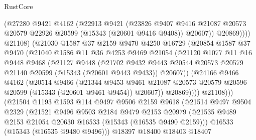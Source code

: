 \begin{lexlean}{RustCore}
\begin{coremodule}
                    (@27280
                      @9421
                      @4162
                      (@22913
                        @9421
                        (@23826
                          @9407
                          @9416
                          @21087
                          @20573
                          @20579
                          @22926
                          @20599
                          (@15343 (@20601 @9416 @9408))
                          @20607))
                      @20869))))
              @21108)
            (@21030
              @1587
              @37
              @2159
              @9470
              @4250
              @16729
              (@20854
                @1587
                @37
                @9470
                (@21040
                  @1586
                  @11
                  @36
                  @4253
                  @9469
                  @21054
                  (@21120
                    @1077
                    @11
                    @16
                    @9448
                    @9468
                    (@21127
                      @9448
                      (@21702
                        @9432
                        @9443
                        @20544
                        @20573
                        @20579
                        @21140
                        @20599
                        (@15343 (@20601 @9443 @9433))
                        @20607))
                    (@24166
                      @9466
                      @4162
                      (@20514
                        @9466
                        (@21344
                          @9453
                          @9461
                          @21087
                          @20573
                          @20579
                          @20596
                          @20599
                          (@15343 (@20601 @9461 @9454))
                          @20607))
                      @20869))))
              @21108)))
        (@21504
          @1193
          @1593
          @114
          @9497
          @9506
          @2159
          @9618
          (@21514
            @9497
            @9504
            @2329
            (@21521
              @9496
              @9503
              @2184
              @9479
              @2153
              @20979
              (@21535 @9489 @2153 @21054 @20630 @16533 (@15343 (@16535 @9490 @2159)))
              @16533
              (@15343 (@16535 @9480 @9496)))
            @18397
            @18400
            @18403
            @18407

\end{coremodule}
\end{lexlean}
